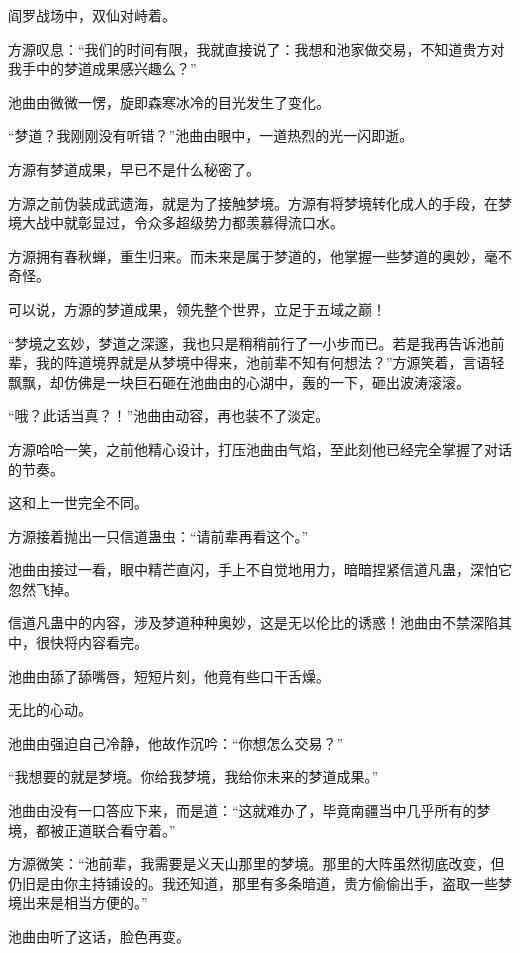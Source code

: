 
\begin{this_body}

阎罗战场中，双仙对峙着。

方源叹息：“我们的时间有限，我就直接说了：我想和池家做交易，不知道贵方对我手中的梦道成果感兴趣么？”

池曲由微微一愣，旋即森寒冰冷的目光发生了变化。

“梦道？我刚刚没有听错？”池曲由眼中，一道热烈的光一闪即逝。

方源有梦道成果，早已不是什么秘密了。

方源之前伪装成武遗海，就是为了接触梦境。方源有将梦境转化成人的手段，在梦境大战中就彰显过，令众多超级势力都羡慕得流口水。

方源拥有春秋蝉，重生归来。而未来是属于梦道的，他掌握一些梦道的奥妙，毫不奇怪。

可以说，方源的梦道成果，领先整个世界，立足于五域之巅！

“梦境之玄妙，梦道之深邃，我也只是稍稍前行了一小步而已。若是我再告诉池前辈，我的阵道境界就是从梦境中得来，池前辈不知有何想法？”方源笑着，言语轻飘飘，却仿佛是一块巨石砸在池曲由的心湖中，轰的一下，砸出波涛滚滚。

“哦？此话当真？！”池曲由动容，再也装不了淡定。

方源哈哈一笑，之前他精心设计，打压池曲由气焰，至此刻他已经完全掌握了对话的节奏。

这和上一世完全不同。

方源接着抛出一只信道蛊虫：“请前辈再看这个。”

池曲由接过一看，眼中精芒直闪，手上不自觉地用力，暗暗捏紧信道凡蛊，深怕它忽然飞掉。

信道凡蛊中的内容，涉及梦道种种奥妙，这是无以伦比的诱惑！池曲由不禁深陷其中，很快将内容看完。

池曲由舔了舔嘴唇，短短片刻，他竟有些口干舌燥。

无比的心动。

池曲由强迫自己冷静，他故作沉吟：“你想怎么交易？”

“我想要的就是梦境。你给我梦境，我给你未来的梦道成果。”

池曲由没有一口答应下来，而是道：“这就难办了，毕竟南疆当中几乎所有的梦境，都被正道联合看守着。”

方源微笑：“池前辈，我需要是义天山那里的梦境。那里的大阵虽然彻底改变，但仍旧是由你主持铺设的。我还知道，那里有多条暗道，贵方偷偷出手，盗取一些梦境出来是相当方便的。”

池曲由听了这话，脸色再变。


\end{this_body}
